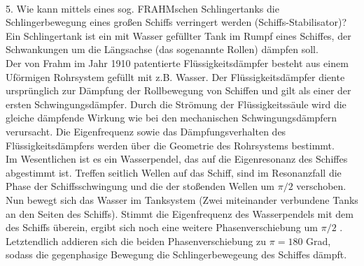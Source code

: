 \\5. Wie kann mittels eines sog. FRAHMschen Schlingertanks die Schlingerbewegung eines großen Schiffs verringert werden (Schiffs-Stabilisator)?\\Ein Schlingertank ist ein mit Wasser gefüllter Tank im Rumpf eines Schiffes, der Schwankungen um die Längsachse (das sogenannte Rollen) dämpfen soll.\\
Der von Frahm im Jahr 1910 patentierte Flüssigkeitsdämpfer besteht aus einem Uförmigen Rohrsystem gefüllt mit  z.B. Wasser. Der Flüssigkeitsdämpfer diente ursprünglich zur Dämpfung der Rollbewegung von Schiffen und gilt als einer der ersten Schwingungsdämpfer. Durch die Strömung der Flüssigkeitssäule wird die gleiche dämpfende Wirkung wie bei den mechanischen Schwingungsdämpfern verursacht. Die Eigenfrequenz sowie das Dämpfungsverhalten des Flüssigkeitsdämpfers werden über die Geometrie des Rohrsystems bestimmt. \\
Im Wesentlichen ist es ein Wasserpendel, das auf die Eigenresonanz des Schiffes abgestimmt ist. Treffen seitlich Wellen auf das Schiff, sind im Resonanzfall die Phase der Schiffsschwingung und die der stoßenden Wellen um $\pi/2$ verschoben. Nun bewegt sich das Wasser im Tanksystem (Zwei miteinander verbundene Tanks an den Seiten des Schiffs).  Stimmt die Eigenfrequenz des Wasserpendels mit dem des Schiffs überein, ergibt sich noch eine weitere Phasenverschiebung um $\pi/2$ . Letztendlich addieren sich die beiden Phasenverschiebung zu $\pi=180 $ Grad, sodass die gegenphasige Bewegung die Schlingerbewegeung des Schiffes dämpft.
